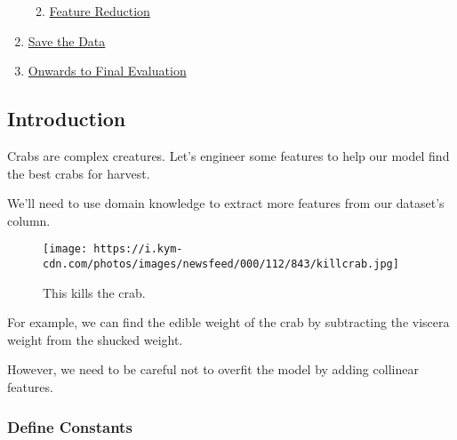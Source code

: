 \documentclass[11pt]{article}
\providecommand{\tightlist}{%
      \setlength{\itemsep}{0pt}\setlength{\parskip}{0pt}}
\begin{document}
\begin{enumerate}
  \begin{enumerate}
  \def\labelenumii{\arabic{enumii}.}
  \tightlist
  \item
    \hyperref[feature-reduction]{Feature Reduction}
  \end{enumerate}
\item
  \hyperref[save-the-data]{Save the Data}
\item
  \hyperref[onwards-to-final-evaluation]{Onwards to Final Evaluation}
\end{enumerate}

    \subsection{Introduction}\label{introduction}

Crabs are complex creatures. Let's engineer some features to help our
model find the best crabs for harvest.

We'll need to use domain knowledge to extract more features from our
dataset's column.

\begin{figure}
\centering
\texttt{[image: https://i.kym-cdn.com/photos/images/newsfeed/000/112/843/killcrab.jpg]}
\caption{This kills the crab.}
\end{figure}

For example, we can find the edible weight of the crab by subtracting
the viscera weight from the shucked weight.

However, we need to be careful not to overfit the model by adding
collinear features.

    \subsubsection{Define Constants}\label{define-constants}
\end{document}
